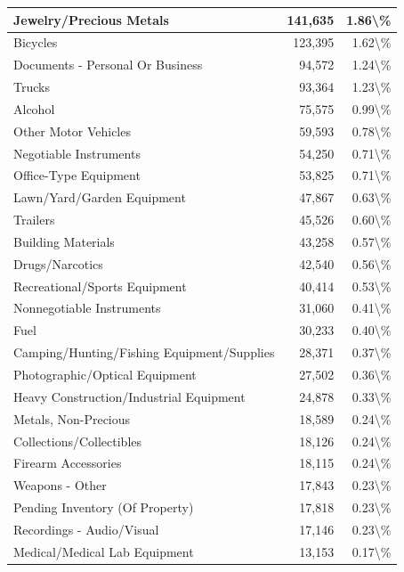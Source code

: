 \documentclass[
]{krantz}
\begin{document}
\begin{longtable}[t]{l|r|r}
Jewelry/Precious Metals & 141,635 & 1.86\textbackslash{}\%\\
\hline
Bicycles & 123,395 & 1.62\textbackslash{}\%\\
\hline
Documents - Personal Or Business & 94,572 & 1.24\textbackslash{}\%\\
\hline
Trucks & 93,364 & 1.23\textbackslash{}\%\\
\hline
Alcohol & 75,575 & 0.99\textbackslash{}\%\\
\hline
Other Motor Vehicles & 59,593 & 0.78\textbackslash{}\%\\
\hline
Negotiable Instruments & 54,250 & 0.71\textbackslash{}\%\\
\hline
Office-Type Equipment & 53,825 & 0.71\textbackslash{}\%\\
\hline
Lawn/Yard/Garden Equipment & 47,867 & 0.63\textbackslash{}\%\\
\hline
Trailers & 45,526 & 0.60\textbackslash{}\%\\
\hline
Building Materials & 43,258 & 0.57\textbackslash{}\%\\
\hline
Drugs/Narcotics & 42,540 & 0.56\textbackslash{}\%\\
\hline
Recreational/Sports Equipment & 40,414 & 0.53\textbackslash{}\%\\
\hline
Nonnegotiable Instruments & 31,060 & 0.41\textbackslash{}\%\\
\hline
Fuel & 30,233 & 0.40\textbackslash{}\%\\
\hline
Camping/Hunting/Fishing Equipment/Supplies & 28,371 & 0.37\textbackslash{}\%\\
\hline
Photographic/Optical Equipment & 27,502 & 0.36\textbackslash{}\%\\
\hline
Heavy Construction/Industrial Equipment & 24,878 & 0.33\textbackslash{}\%\\
\hline
Metals, Non-Precious & 18,589 & 0.24\textbackslash{}\%\\
\hline
Collections/Collectibles & 18,126 & 0.24\textbackslash{}\%\\
\hline
Firearm Accessories & 18,115 & 0.24\textbackslash{}\%\\
\hline
Weapons - Other & 17,843 & 0.23\textbackslash{}\%\\
\hline
Pending Inventory (Of Property) & 17,818 & 0.23\textbackslash{}\%\\
\hline
Recordings - Audio/Visual & 17,146 & 0.23\textbackslash{}\%\\
\hline
Medical/Medical Lab Equipment & 13,153 & 0.17\textbackslash{}\%\\

\end{longtable}
\end{document}
